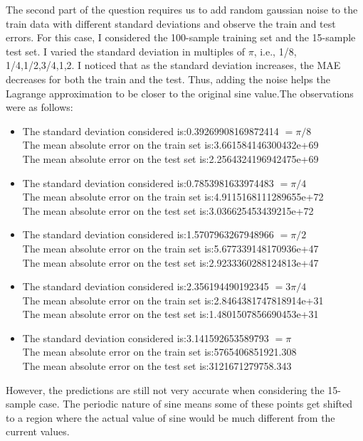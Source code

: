 \documentclass[a4paper]{article}
\theoremstyle{definition}
\newenvironment{soln}{
    \leavevmode\color{blue}\ignorespaces
}{}
\begin{document}
\begin{soln}
The second part of the question requires us to add random gaussian noise to the train data with different standard deviations and observe the train and test errors. For this case, I considered the 100-sample training set and the 15-sample test set. I varied the standard deviation in multiples of $\pi$, i.e., 1/8, 1/4,1/2,3/4,1,2. I noticed that as the standard deviation increases, the MAE decreases for both the train and the test. Thus, adding the noise helps the Lagrange approximation to be closer to the original sine value.The observations were as follows:
\begin{itemize}
    \item The standard deviation considered is:0.39269908169872414 $=\pi/8$\\
The mean absolute error on the train set is:3.661584146300432e+69\\
The mean absolute error on the test set is:2.2564324196942475e+69\\
\item The standard deviation considered is:0.7853981633974483 $=\pi/4$\\
The mean absolute error on the train set is:4.9115168111289655e+72\\
The mean absolute error on the test set is:3.036625453439215e+72\\
\item The standard deviation considered is:1.5707963267948966 $=\pi/2$\\
The mean absolute error on the train set is:5.677339148170936e+47\\
The mean absolute error on the test set is:2.9233360288124813e+47\\
\item The standard deviation considered is:2.356194490192345 $=3\pi/4$\\
The mean absolute error on the train set is:2.8464381747818914e+31\\
The mean absolute error on the test set is:1.4801507856690453e+31\\
\item The standard deviation considered is:3.141592653589793 $=\pi$\\
The mean absolute error on the train set is:5765406851921.308\\
The mean absolute error on the test set is:3121671279758.343\\
\end{itemize}

However, the predictions are still not very accurate when considering the 15-sample case. The periodic nature of sine means some of these points get shifted to a region where the actual value of sine would be much different from the current values.

\end{soln}


\end{document}
